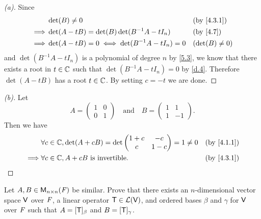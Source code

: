 \begin{proof}[(a)]
  Since
  \begin{align*}
             & \det(B) \neq 0                                   &  & \text{(by \cref{4.3.1})} \\
    \implies & \det(A - tB) = \det(B) \det(B^{-1} A - t I_n)    &  & \text{(by \cref{4.7})}   \\
    \implies & \det(A - tB) = 0 \iff \det(B^{-1} A - t I_n) = 0 &  & (\det(B) \neq 0)
  \end{align*}
  and \(\det(B^{-1} A - t I_n)\) is a polynomial of degree \(n\) by \cref{5.3}, we know that there exists a root in \(t \in \mathbb{C}\) such that \(\det(B^{-1} A - t I_n) = 0\) by \cref{d.4}.
  Therefore \(\det(A - tB)\) has a root \(t \in \mathbb{C}\).
  By setting \(c = -t\) we are done.
\end{proof}

\begin{proof}[(b)]
  Let
  \[
    A = \begin{pmatrix}
      1 & 0 \\
      0 & 1
    \end{pmatrix} \quad \text{and} \quad B = \begin{pmatrix}
      1 & 1  \\
      1 & -1
    \end{pmatrix}.
  \]
  Then we have
  \begin{align*}
             & \forall c \in \C, \det(A + cB) = \det\begin{pmatrix}
                                                      1 + c & -c    \\
                                                      c     & 1 - c
                                                    \end{pmatrix} = 1 \neq 0 &  & \text{(by \cref{4.1.1})} \\
    \implies & \forall c \in \C, A + cB \text{ is invertible}.      &  & \text{(by \cref{4.3.1})}
  \end{align*}
\end{proof}

\begin{ex}\label{ex:5.1.19}
  Let \(A, B \in \mathsf{M}_{{n} \times n}({\mathit{F}})\) be similar.
  Prove that there exists an \(n\)-dimensional vector space \(\mathsf{V}\) over \(\mathit{F}\), a linear operator \(\mathsf{T} \in \mathcal{L}(\mathsf{V})\), and ordered bases \(\beta\) and \(\gamma\) for \(\mathsf{V}\) over \(\mathit{F}\) such that \(A = [\mathsf{T}]_{\beta}\) and \(B = [\mathsf{T}]_{\gamma}\).
\end{ex}


